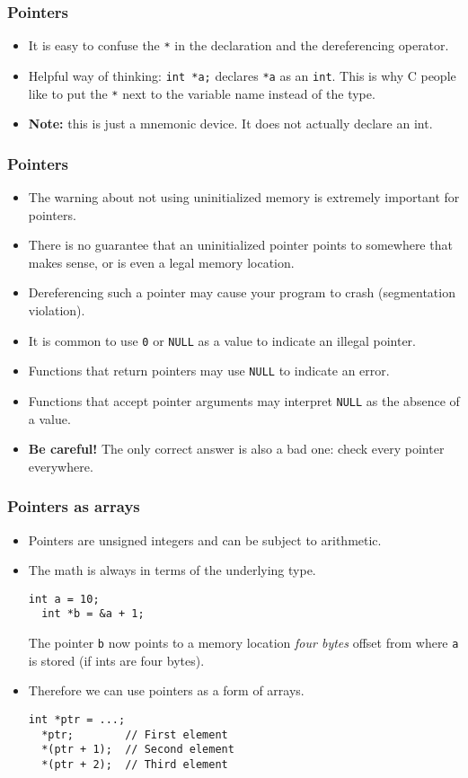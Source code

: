 \begin{frame}
  \frametitle{Pointers}
  \begin{itemize}
  \item It is easy to confuse the \texttt{*} in the declaration and the
    dereferencing operator.
  \item Helpful way of thinking: \texttt{int *a;} declares \texttt{*a} as an
    \texttt{int}. This is why C people like to put the \texttt{*} next to the
    variable name instead of the type.
  \item \textbf{Note:} this is just a mnemonic device. It does not actually
    declare an int.
  \end{itemize}
\end{frame}

\begin{frame}
  \frametitle{Pointers}
  \begin{itemize}
  \item The warning about not using uninitialized memory is extremely important
    for pointers.
  \item There is no guarantee that an uninitialized pointer points to
    somewhere that makes sense, or is even a legal memory location.
  \item Dereferencing such a pointer may cause your program to crash
    (segmentation violation).
  \item It is common to use \texttt{0} or \texttt{NULL} as a value to indicate
    an illegal pointer.
  \item Functions that return pointers may use \texttt{NULL} to indicate an
    error.
  \item Functions that accept pointer arguments may interpret \texttt{NULL} as
    the absence of a value.
  \item \textbf{Be careful!} The only correct answer is also a bad one: check
    every pointer everywhere.
  \end{itemize}
\end{frame}

\begin{frame}[fragile]
  \frametitle{Pointers as arrays}
  \begin{itemize}
  \item Pointers are unsigned integers and can be subject to arithmetic.
  \item The math is always in terms of the underlying type.
\begin{lstlisting}[style=c]
  int a = 10;
  int *b = &a + 1;
\end{lstlisting}
    The pointer \texttt{b} now points to a memory location \emph{four bytes}
    offset from where \texttt{a} is stored (if ints are four bytes).
  \item Therefore we can use pointers as a form of arrays.
\begin{lstlisting}[style=c]
  int *ptr = ...;
  *ptr;        // First element
  *(ptr + 1);  // Second element
  *(ptr + 2);  // Third element
\end{lstlisting}
  \end{itemize}
\end{frame}


